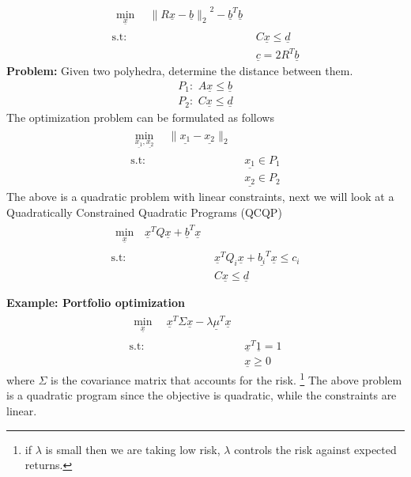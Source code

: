 \documentclass{tufte-handout}
\theoremstyle{remark}
\renewcommand{\vec}[1]{\underline{#1}}
\newcommand\norm[1]{\ensuremath{\lVert#1\rVert_2}}
\newcommand\twospace{\,\,}
\begin{document}
\begin{align}
    \begin{split}
        \min_{\vec{x}}\, &\twospace\norm{R\vec{x}-\vec{b}}^2-\vec{b}^T\vec{b}
    \end{split}\\ 
    \text{s.t:}
    \twospace & C\vec{x} \leq \vec{d}\\
    & \vec{c} = 2R^T\vec{b} \nonumber
\end{align}
\textbf{Problem:} Given two polyhedra, determine the distance between them.
\begin{align}
    P_1:\twospace A\vec{x}\leq\vec{b}\\
    P_2:\twospace C\vec{x}\leq\vec{d}
\end{align}
The optimization problem can be formulated as follows
\begin{align}
    \begin{split}
        \min_{\vec{x_1},\vec{x_2}}\, &\twospace\norm{\vec{x_1}-\vec{x_2}}
    \end{split}\\ 
    \text{s.t:}
    \twospace & \vec{x_1} \in P_1\\
    & \vec{x_2} \in P_2 \nonumber
\end{align}
The above is a quadratic problem with linear constraints, next we will look at a Quadratically Constrained Quadratic Programs (QCQP)
\begin{align}
    \begin{split}
        \min_{\vec{x}}\, &\vec{x}^TQ\vec{x}+\vec{b}^T\vec{x}
    \end{split}\\ 
    \text{s.t:}
    \twospace & \vec{x}^TQ_i\vec{x}+\vec{b_i}^T\vec{x}\leq c_i\\
    & C\vec{x}\leq\vec{d} \nonumber
\end{align}

\textbf{Example: Portfolio optimization}
\begin{align}
    \begin{split}
        \min_{\vec{x}}\, &\twospace\vec{x}^T\Sigma\vec{x}-\lambda\vec{\mu}^T\vec{x}
    \end{split}\\ 
    \text{s.t:}
    \twospace & \vec{x}^T\vec{1} = 1\\
    & \vec{x}\geq 0 \nonumber
\end{align}
where $\Sigma$ is the covariance matrix that accounts for the risk.
\footnote{if $\lambda$ is small then we are taking low risk, $\lambda$ controls the risk against expected returns.}
The above problem is a quadratic program since the objective is quadratic, while the constraints are linear.
\end{document}
